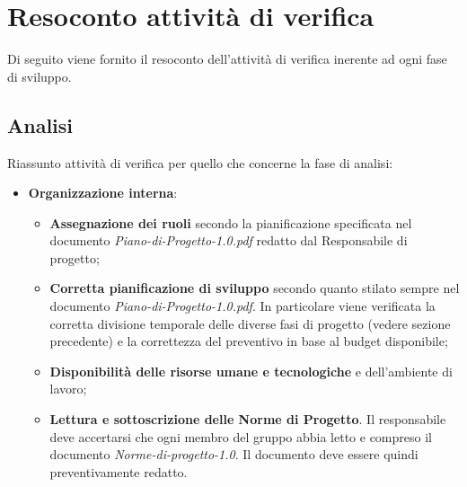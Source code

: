 \documentclass[a4paper,11pt]{article}
\begin{document}
\section{Resoconto attività di verifica}
Di seguito viene fornito il resoconto dell'attività di verifica inerente ad ogni fase di sviluppo.
\subsection{Analisi}
Riassunto attività di verifica per quello che concerne la fase di analisi:
\begin{itemize}
\item \textbf{Organizzazione interna}:
\begin{itemize}
\item \textbf{Assegnazione dei ruoli} secondo la pianificazione specificata nel documento \textit{Piano-di-Progetto-1.0.pdf} redatto dal Responsabile di progetto;
\item \textbf{Corretta pianificazione di sviluppo} secondo quanto stilato sempre nel documento \textit{Piano-di-Progetto-1.0.pdf}. In particolare viene verificata la corretta divisione temporale delle diverse fasi di progetto (vedere sezione precedente) e la correttezza del preventivo in base al budget disponibile;
\item \textbf{Disponibilità delle risorse umane e tecnologiche} e dell'ambiente di lavoro;
\item \textbf{Lettura e sottoscrizione delle Norme di Progetto}. Il responsabile deve accertarsi che ogni membro del gruppo abbia letto e compreso il documento \textit{Norme-di-progetto-1.0}. Il documento deve essere quindi preventivamente redatto.


\end{itemize} 
 

\end{itemize}
\end{document}
